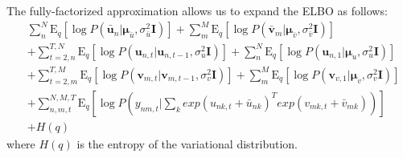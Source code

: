 \documentclass{sig-alternate}
\newcommand{\E}{\text{E}}
\begin{document}
The fully-factorized approximation allows us to expand the ELBO as follows:
{\small
\begin{align*}
& \sum_{n}^N \E_{q}[\log P(\mathbf{\bar{u}}_{n} | \bm{\mu}_{\bar{u}}, \sigma^2_{\bar{u}}\mathbf{I}) ] 
+ \sum_{m}^M \E_{q}[\log P(\mathbf{\bar{v}}_{m} | \bm{\mu}_{\bar{v}}, \sigma^2_{\bar{v}}\mathbf{I}) ] \\ 
&+ \sum_{t=2,n}^{T,N} {\E_{q}[ \log P(\mathbf{u}_{n,t} | \mathbf{u}_{n,t-1}, \sigma_u^2\mathbf{I}) ]} + \sum_{n}^N{\E_q[\log P(\mathbf{u}_{n,1} | \bm\mu_u, \sigma_u^2\mathbf{I}) ]} \\ 
&+ \sum_{t=2,m}^{T,M} {\E_{q}[ \log P(\mathbf{v}_{m,t} | \mathbf{v}_{m,t-1}, \sigma_v^2\mathbf{I})]} + \sum_{m}^M{\E_q[\log P(\mathbf{v}_{v,1} | \bm\mu_v, \sigma_v^2\mathbf{I}) ]} \\
&+ \sum_{n,m,t}^{N,M,T} {\E_{q}[\log P(y_{nm,t} | \sum_k exp(u_{nk,t} + \bar{u}_{nk})^T exp(v_{mk,t} + \bar{v}_{mk})) ]} \\
& + {H(q)} 
\end{align*}}
where $H(q)$ is the entropy of the variational distribution.
\end{document}
